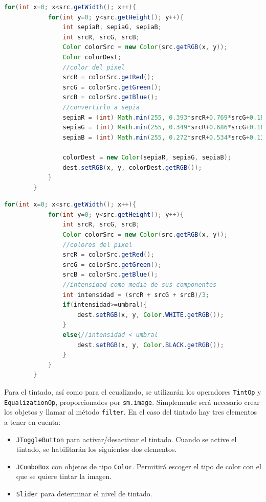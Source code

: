 \begin{lstlisting}[language=Java, caption=Filtro sepia, label=lst:graddesc]
		for(int x=0; x<src.getWidth(); x++){
            for(int y=0; y<src.getHeight(); y++){
                int sepiaR, sepiaG, sepiaB;
                int srcR, srcG, srcB;
                Color colorSrc = new Color(src.getRGB(x, y));
                Color colorDest;
                //color del pixel
                srcR = colorSrc.getRed();
                srcG = colorSrc.getGreen();
                srcB = colorSrc.getBlue();
                //convertirlo a sepia
                sepiaR = (int) Math.min(255, 0.393*srcR+0.769*srcG+0.189*srcB);
                sepiaG = (int) Math.min(255, 0.349*srcR+0.686*srcG+0.168*srcB);
                sepiaB = (int) Math.min(255, 0.272*srcR+0.534*srcG+0.131*srcB);
                
                colorDest = new Color(sepiaR, sepiaG, sepiaB);
                dest.setRGB(x, y, colorDest.getRGB());
            }
        }
\end{lstlisting}
\begin{lstlisting}[language=Java, caption=Filtro umbralización, label=lst:graddesc]
		for(int x=0; x<src.getWidth(); x++){
            for(int y=0; y<src.getHeight(); y++){
                int srcR, srcG, srcB;
                Color colorSrc = new Color(src.getRGB(x, y));
                //colores del pixel
                srcR = colorSrc.getRed();
                srcG = colorSrc.getGreen();
                srcB = colorSrc.getBlue();
                //intensidad como media de sus componentes
                int intensidad = (srcR + srcG + srcB)/3;
                if(intensidad>=umbral){
                    dest.setRGB(x, y, Color.WHITE.getRGB());
                }
                else{//intensidad < umbral
                    dest.setRGB(x, y, Color.BLACK.getRGB());
                }
            }
        }
\end{lstlisting}
\vskip0.3cm 
Para el tintado, así como para el ecualizado, se utilizarán los operadores \texttt{TintOp} y \texttt{EqualizationOp}, proporcionados por \texttt{sm.image}. Simplemente será necesario crear los objetos y llamar al método \texttt{filter}. En el caso del tintado hay tres elementos a tener en cuenta:
\begin{itemize}
\item{\texttt{JToggleButton} para activar/desactivar el tintado. Cuando se active el tintado, se habilitarán los siguientes dos elementos.}
\item{\texttt{JComboBox} con objetos de tipo \texttt{Color}. Permitirá escoger el tipo de color con el que se quiere tintar la imagen.}
\item{\texttt{Slider} para determinar el nivel de tintado.}
\end{itemize}
